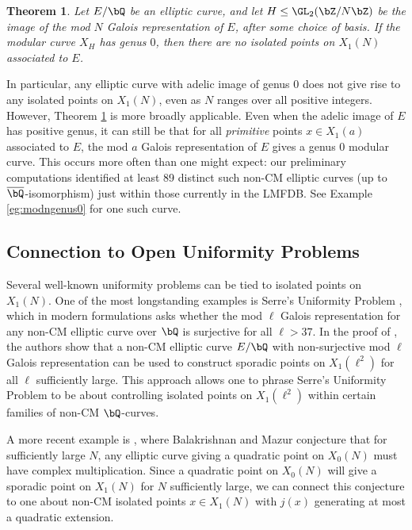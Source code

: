 \documentclass[11pt,reqno]{amsart}
\theoremstyle{plain}
\newtheorem{theorem}{Theorem}%
\theoremstyle{definition}
\newcommand{\Q}{\bQ}
\newcommand{\Z}{\bZ}
\begin{document}
\begin{theorem}\label{Prop:Genus0Intro}
Let $E/\Q$ be an elliptic curve, and let $H \leq \GL_2(\Z/N\Z)$ be the image of the mod $N$ Galois representation of $E$, after some choice of basis. If the modular curve $X_H$ has genus $0$, then there are no isolated points on $X_1(N)$ associated to $E$.
\end{theorem}

\noindent In particular, any elliptic curve with adelic image of genus 0 does not give rise to any isolated points on $X_1(N)$, even as $N$ ranges over all positive integers. However, Theorem \ref{Prop:Genus0Intro} is more broadly applicable. Even when the adelic image of $E$ has positive genus, it can still be that for all \emph{primitive} points $x \in X_1(a)$ associated to $E$, the mod $a$ Galois representation of $E$ gives a genus 0 modular curve. This occurs more often than one might expect: our preliminary computations identified at least 89 distinct such non-CM elliptic curves (up to $\overline{\Q}$-isomorphism) just within those currently in the LMFDB. See Example \ref{eg:modngenus0} for one such curve.

\subsection{Connection to Open Uniformity Problems}\label{sec:UniformityConnections} Several well-known uniformity problems can be tied to isolated points on $X_1(N)$. One of the most longstanding examples is Serre's Uniformity Problem \cite[\S\,4.3]{serre72}, which in modern formulations \cite{sutherland,ZywinaImages} asks whether the mod $\ell$ Galois representation for any non-CM elliptic curve over $\Q$ is surjective for all $\ell>37$. In the proof of \cite[Theorem~1.3]{BourdonNajman2021}, the authors show that a non-CM elliptic curve $E/\Q$ with non-surjective mod $\ell$ Galois representation can be used to construct sporadic points on $X_1(\ell^2)$ for all $\ell$ sufficiently large. This approach allows one to phrase Serre's Uniformity Problem to be about controlling isolated points on $X_1(\ell^2)$ within certain families of non-CM $\Q$-curves.

A more recent example is \cite[Conjecture 17]{BalakrishnanMazur23}, where Balakrishnan and Mazur conjecture that for sufficiently large $N$, any elliptic curve giving a quadratic point on $X_0(N)$ must have complex multiplication. Since a quadratic point on $X_0(N)$ will give a sporadic point on $X_1(N)$ for $N$ sufficiently large, we can connect this conjecture to one about non-CM isolated points $x \in X_1(N)$ with $j(x)$ generating at most a quadratic extension.
\end{document}
